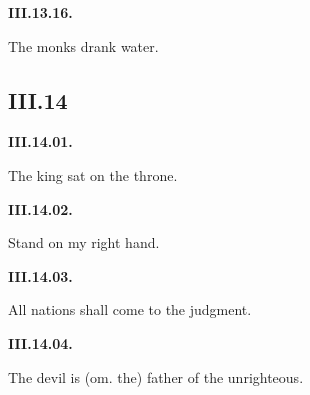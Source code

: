 \par\begin{minipage}{\linewidth}\raggedright
\textbf{III.13.16.}

The monks drank water.

\end{minipage}\par\addvspace{4pt}

\subsection*{III.14}

\par\begin{minipage}{\linewidth}\raggedright
\textbf{III.14.01.}

The king sat on the throne.

\end{minipage}\par\addvspace{4pt}

\par\begin{minipage}{\linewidth}\raggedright
\textbf{III.14.02.}

Stand on my right hand.

\end{minipage}\par\addvspace{4pt}

\par\begin{minipage}{\linewidth}\raggedright
\textbf{III.14.03.}

All nations shall come to the judgment.

\end{minipage}\par\addvspace{4pt}

\par\begin{minipage}{\linewidth}\raggedright
\textbf{III.14.04.}

The devil is (om. the) father of the unrighteous.

\end{minipage}\par\addvspace{4pt}

